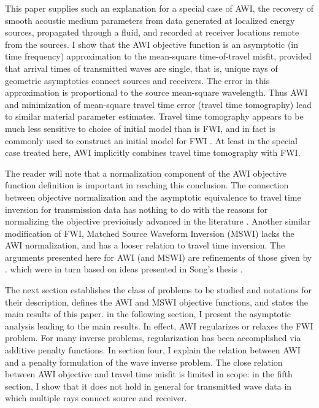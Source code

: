 This paper supplies such an explanation for a special case of AWI, the recovery of smooth acoustic
medium parameters from data generated at localized energy sources,
propagated through a fluid, and recorded at receiver locations remote
from the sources. I show that the AWI objective function is an
asymptotic (in time frequency) approximation to the mean-square
time-of-travel misfit, provided that arrival times of transmitted
waves are single, that is, unique rays of geometric asymptotics
connect sources and receivers. The error in this approximation is
proportional to the source mean-square wavelength. Thus AWI and
minimization of mean-square travel time error (travel time tomography)
lead to similar material parameter estimates. Travel time tomography
appears to be much less sensitive to choice of initial model than is
FWI, and in fact is commonly used to construct an initial model for
FWI \cite[]{Bordingetal:87,SirguePratt:04,VirieuxOperto:09}. At least
in the special case treated here, AWI implicitly combines travel time
tomography with FWI.

The reader will
note that a normalization component of the AWI objective function
definition is important in reaching this conclusion. The connection
between objective normalization and the asymptotic equivalence to
travel time inversion for transmission data has nothing to do with the
reasons for normalizing the objective previoiusly advanced in the
literature \cite[]{Warner:16,LiAlkhalifah:21}. Another similar modification of
FWI, Matched Source Waveform Inversion (MSWI)
\cite[]{HuangSymes2015SEG,HuangSymes:Geo17} lacks the AWI
normalization, and has a looser relation to travel time inversion. The
arguments presented here for AWI (and MSWI) are refinements of those
given by \cite{HuangSymes:Geo17}. which were in turn based on ideas
presented in Song's thesis \cite[]{Song:94c}.


The next section establishes the class of problems to be studied and notations
for their description, defines the AWI and MSWI objective functions,
and states the main results of this paper. in the following section, I present the
asymptotic analysis leading to the main results. In
effect, AWI regularizes or relaxes the FWI problem. For many inverse
problems, regularization has been accomplished via additive penalty
functions. In section four, I explain the relation between AWI and a
penalty formulation of the wave inverse problem. The close relation
between AWI objective and travel time misfit is limited in scope: in
the fifth section, I show that it does not hold in general for
transmitted wave data in which multiple rays connect source and
receiver.


